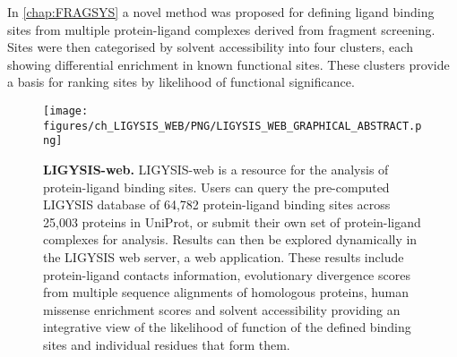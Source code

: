 
In \autoref{chap:FRAGSYS} a novel method was proposed for defining ligand binding sites from multiple protein-ligand complexes derived from fragment screening. Sites were then categorised by solvent accessibility into four clusters, each showing differential enrichment in known functional sites. These clusters provide a basis for ranking sites by likelihood of functional significance.

\begin{figure}[htb!]
    \centering
    \texttt{[image: figures/ch\_LIGYSIS\_WEB/PNG/LIGYSIS\_WEB\_GRAPHICAL\_ABSTRACT.png]}
    \caption[LIGYSIS-web]{\textbf{LIGYSIS-web.} LIGYSIS-web is a resource for the analysis of protein-ligand binding sites. Users can query the pre-computed LIGYSIS database of 64,782 protein-ligand binding sites across 25,003 proteins in UniProt, or submit their own set of protein-ligand complexes for analysis. Results can then be explored dynamically in the LIGYSIS web server, a web application. These results include protein-ligand contacts information, evolutionary divergence scores from multiple sequence alignments of homologous proteins, human missense enrichment scores and solvent accessibility providing an integrative view of the likelihood of function of the defined binding sites and individual residues that form them.}
    \label{fig:LIGYSIS_WEB}
\end{figure}

